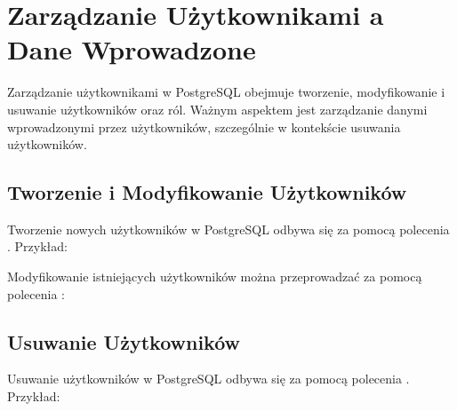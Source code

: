 \documentclass[letterpaper,10pt,polish]{sphinxmanual}
\begin{document}
\sphinxstepscope


\chapter{Zarządzanie Użytkownikami a Dane Wprowadzone}
\label{\detokenize{sprawozdanie/source/rozdzialy/rozdzial3:zarzadzanie-uzytkownikami-a-dane-wprowadzone}}\label{\detokenize{sprawozdanie/source/rozdzialy/rozdzial3::doc}}
\sphinxAtStartPar
Zarządzanie użytkownikami w PostgreSQL obejmuje tworzenie, modyfikowanie
i usuwanie użytkowników oraz ról. Ważnym aspektem jest zarządzanie
danymi wprowadzonymi przez użytkowników, szczególnie w kontekście
usuwania użytkowników.


\section{Tworzenie i Modyfikowanie Użytkowników}
\label{\detokenize{sprawozdanie/source/rozdzialy/rozdzial3:tworzenie-i-modyfikowanie-uzytkownikow}}
\sphinxAtStartPar
Tworzenie nowych użytkowników w PostgreSQL odbywa się za pomocą
polecenia . Przykład:

\begin{sphinxVerbatim}[commandchars=\\\{\}]
     
\end{sphinxVerbatim}

\sphinxAtStartPar
Modyfikowanie istniejących użytkowników można przeprowadzać za pomocą
polecenia :

\begin{sphinxVerbatim}[commandchars=\\\{\}]
     
\end{sphinxVerbatim}


\section{Usuwanie Użytkowników}
\label{\detokenize{sprawozdanie/source/rozdzialy/rozdzial3:usuwanie-uzytkownikow}}
\sphinxAtStartPar
Usuwanie użytkowników w PostgreSQL odbywa się za pomocą polecenia
. Przykład:
\end{document}
